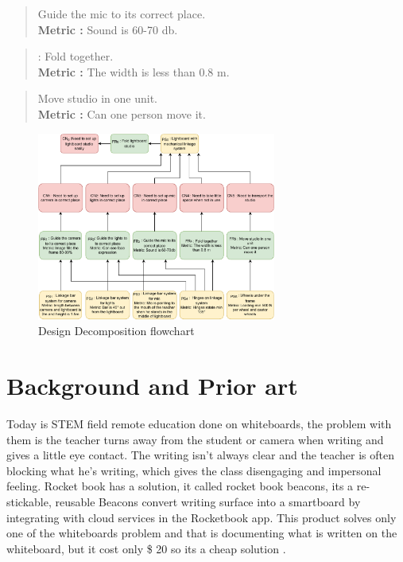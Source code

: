 \documentclass[a4paper]{jpconf}
\begin{document}
\begin{quote} 
	\textbf{} Guide the mic  to its correct place.
	\\ \textbf{Metric :} Sound is 60-70 db\cite{db}.
\end{quote}

\begin{quote} 
	\textbf{} :  Fold together.
	\\ \textbf{Metric :} The width is less than 0.8 m.
\end{quote}

\begin{quote} 
	\textbf{} Move studio in one unit.
	\\ \textbf{Metric :} Can one person move it.
\end{quote}


\begin{figure}[]
	\centering
	\includegraphics [width=0.7\textwidth]{matrix.pdf}
	\caption{Design Decomposition flowchart}\label{fig:matrix}
\end{figure}




\section{Background and Prior art}

Today is STEM field remote education done on whiteboards, the problem with them is the teacher turns away from the student or camera when writing and gives a little eye contact. The writing isn't always clear and the teacher is often blocking what he's writing, which gives the class disengaging and impersonal feeling. 
Rocket book has a solution, it called rocket book beacons, its a re-stickable, reusable Beacons convert writing surface into a smartboard by integrating with cloud services in the Rocketbook app.
This product solves only one of the whiteboards problem and that is documenting what is written on the whiteboard, but it cost only \$ 20 so its a cheap solution \cite{Rocketbook}.
\end{document}
